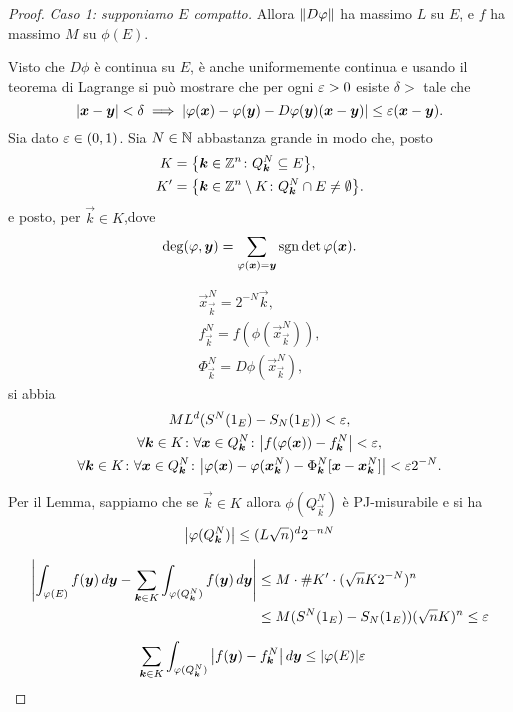 \begin{proof}
\emph{Caso 1: supponiamo $E$ compatto.}
Allora ${\left\Vert D\varphi\right\Vert}$ ha massimo $L$ su $E$, e $f$ ha massimo $M$ 
su $\phi(E)$. 

Visto che $D\phi$ è continua su $E$, è anche uniformemente continua e 
usando il teorema di Lagrange si può mostrare che per ogni $\varepsilon>0$ 
esiste $\delta>$ tale che
\[
 {\left|\boldsymbol x - \boldsymbol y\right|}<\delta 
 \implies 
 {\left|\varphi(\boldsymbol x)-\varphi(\boldsymbol y)-D\varphi(\boldsymbol y)(\boldsymbol x - \boldsymbol y)\right|}
 \le \varepsilon (\boldsymbol x - \boldsymbol y).
\]
Sia dato $\varepsilon\in(0,1)$.
Sia $N\in {\mathbb N}$ abbastanza grande in modo che, posto
\begin{align*}
  K&={\left\{ \boldsymbol k\in {\mathbb Z}^n\colon Q^N_{\boldsymbol k}\subseteq E \right\}},\\
  K'&={\left\{ \boldsymbol k\in {\mathbb Z}^n\setminus K \colon Q^N_{\boldsymbol k}\cap E\neq \emptyset \right\}}.
\end{align*}
e posto, per $\vec k \in K$,dove 
\[
  \deg(\varphi,\boldsymbol y) = \sum_{\varphi(\boldsymbol x)=\boldsymbol y} \operatorname{sgn} \det \varphi(\boldsymbol x).
\]

\begin{gather*}
  \vec x^N_{\vec k} = 2^{-N}\vec k,\\
  f^N_{\vec k} = f(\phi(\vec x^N_{\vec k})),\\ 
  \Phi^N_{\vec k} = D\phi(\vec x^N_{\vec k}), 
\end{gather*}
si abbia
\begin{gather*}
  M L^d (S^N(1_E)-S_N(1_E)) < \varepsilon,\\
  \forall \boldsymbol k\in K \colon \forall \boldsymbol x \in Q^N_{\boldsymbol k}\colon
    {\left|f(\varphi(\boldsymbol x))-f^N_{\boldsymbol k}\right|} < \varepsilon,\\
  \forall \boldsymbol k\in K \colon \forall \boldsymbol x \in Q^N_{\boldsymbol k}\colon
    {\left|\varphi(\boldsymbol x) - \varphi(\boldsymbol x^N_{\boldsymbol k})-\Phi^N_{\boldsymbol k}[\boldsymbol x-\boldsymbol x^N_{\boldsymbol k}]\right|} < \varepsilon 2^{-N}.
\end{gather*}

Per il Lemma, sappiamo che se $\vec k \in K$ allora $\phi(Q^N_{\vec k})$ è PJ-misurabile 
e si ha 
\[
 {\left|\varphi(Q^N_{\boldsymbol k})\right|} 
 \le (L\sqrt n)^d 2^{-nN}
\]

\begin{align*}
  {\left|\int_{\varphi(E)} f(\boldsymbol y)\, d\boldsymbol y 
  - \sum_{\boldsymbol k \in K} \int_{\varphi(Q^N_{\boldsymbol k})} f(\boldsymbol y)\, d\boldsymbol y\right|}
  &\le M \cdot \#K' \cdot (\sqrt n K 2^{-N})^n \\
  &\le M (S^N(1_E)-S_N(1_E)) (\sqrt n K)^n
  \le \varepsilon 
\end{align*}

\begin{align*}
\sum_{\boldsymbol k \in K}\int_{\varphi(Q^N_{\boldsymbol k})} {\left|f(\boldsymbol y) - f^N_{\boldsymbol k}\right|}\, d\boldsymbol y
&\le  {\left|\varphi(E)\right|} \varepsilon 
\end{align*}


\end{proof}
